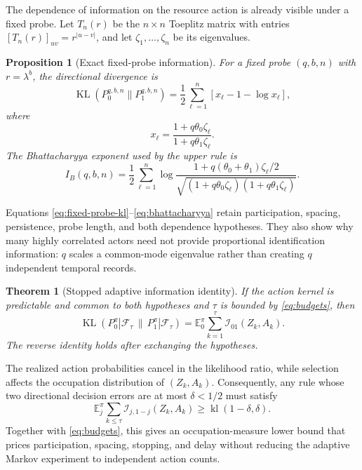 \documentclass[journal]{IEEEtran}
\newtheorem{theorem}{Theorem}
\newtheorem{proposition}{Proposition}
\newcommand{\E}{\mathbb{E}}
\newcommand{\F}{\mathcal{F}}
\newcommand{\KL}{\operatorname{KL}}
\begin{document}
The dependence of information on the resource action is already visible under a fixed probe.
Let $T_n(r)$ be the $n\times n$ Toeplitz matrix with entries $[T_n(r)]_{uv}=r^{|u-v|}$, and let $\zeta_1,\ldots,\zeta_n$ be its eigenvalues.

\begin{proposition}[Exact fixed-probe information]
For a fixed probe $(q,b,n)$ with $r=\lambda^b$, the directional divergence is
\begin{equation}
\KL(P_0^{q,b,n}\|P_1^{q,b,n})
=\frac12\sum_{\ell=1}^n
\left[x_\ell-1-\log x_\ell\right],
\label{eq:fixed-probe-kl}
\end{equation}
where
\begin{equation}
x_\ell=\frac{1+q\theta_0\zeta_\ell}
{1+q\theta_1\zeta_\ell}.
\label{eq:fixed-probe-ratio}
\end{equation}
The Bhattacharyya exponent used by the upper rule is
\begin{equation}
I_B(q,b,n)=\frac12\sum_{\ell=1}^n
\log\frac{1+q(\theta_0+\theta_1)\zeta_\ell/2}
{\sqrt{(1+q\theta_0\zeta_\ell)(1+q\theta_1\zeta_\ell)}}.
\label{eq:bhattacharyya}
\end{equation}
\label{prop:fixed-information}
\end{proposition}

Equations \eqref{eq:fixed-probe-kl}--\eqref{eq:bhattacharyya} retain participation, spacing, persistence, probe length, and both dependence hypotheses.
They also show why many highly correlated actors need not provide proportional identification information: $q$ scales a common-mode eigenvalue rather than creating $q$ independent temporal records.

\begin{theorem}[Stopped adaptive information identity]
If the action kernel is predictable and common to both hypotheses and $\tau$ is bounded by \eqref{eq:budgets}, then
\begin{equation}
\KL(P_0^\pi|\F_\tau\,\|\,P_1^\pi|\F_\tau)=\E_0^\pi\sum_{k=1}^{\tau}\mathcal{I}_{01}(Z_k,A_k).
\label{eq:adaptive-kl}
\end{equation}
The reverse identity holds after exchanging the hypotheses.
\label{thm:adaptive-kl}
\end{theorem}
The realized action probabilities cancel in the likelihood ratio, while selection affects the occupation distribution of $(Z_k,A_k)$.
Consequently, any rule whose two directional decision errors are at most $\delta<1/2$ must satisfy
\begin{equation}
\E_j^\pi\sum_{k\le\tau}\mathcal{I}_{j,1-j}(Z_k,A_k)\ge \operatorname{kl}(1-\delta,\delta).
\label{eq:info-constraint}
\end{equation}
Together with \eqref{eq:budgets}, this gives an occupation-measure lower bound that prices participation, spacing, stopping, and delay without reducing the adaptive Markov experiment to independent action counts.
\end{document}

